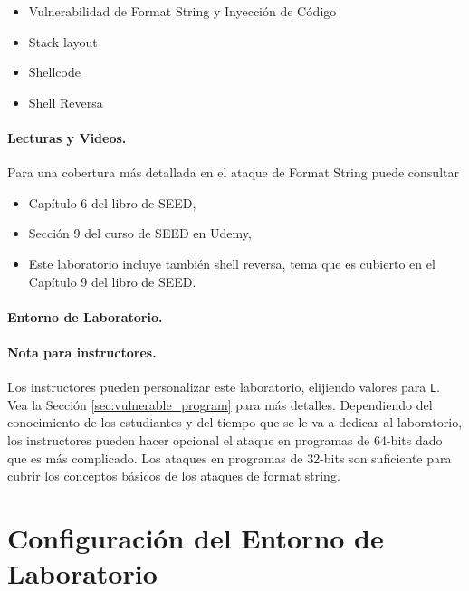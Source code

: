 \begin{itemize}[noitemsep]
\item Vulnerabilidad de Format String y Inyección de Código
\item Stack layout
\item Shellcode 
\item Shell Reversa
\end{itemize}


\paragraph{Lecturas y Videos.}
Para una cobertura más detallada en el ataque de Format String puede consultar

\begin{itemize}
\item Capítulo 6 del libro de SEED, \seedbook
\item Sección 9 del curso de SEED en Udemy, \seedcsvideo
\item Este laboratorio incluye también shell reversa, tema que es cubierto en el Capítulo 9 del libro de SEED.
\end{itemize}


\paragraph{Entorno de Laboratorio.} \seedenvironmentC

\paragraph{Nota para instructores.}
Los instructores pueden personalizar este laboratorio, elijiendo valores para \texttt{L}. Vea la Sección \ref{sec:vulnerable_program} para más detalles.
Dependiendo del conocimiento de los estudiantes y del tiempo que se le va a dedicar al laboratorio, los instructores pueden hacer opcional el ataque en programas de 64-bits dado que es más complicado. Los ataques en programas de 32-bits son suficiente para cubrir los conceptos básicos de los ataques de format string.

\section{Configuración del Entorno de Laboratorio} 


